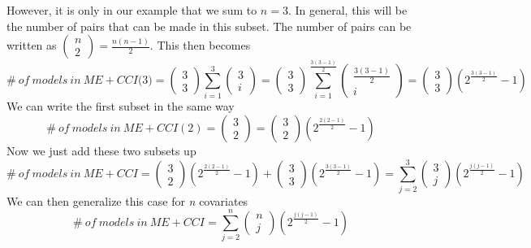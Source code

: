 However, it is only in our example that we sum to $n=3$. In general, this will be the number of pairs that can be made in this subset. The number of pairs can be written as $\left( \begin{array}{c}
n \\ 
2 \end{array}
\right)=\frac{n\left(n-1\right)}{2}$. This then becomes
\[\#\ of\ models\ in\ ME + CCI\textit{(3)}=\left( \begin{array}{c}
3 \\ 
3 \end{array}
\right)\sum^3_{i=1}{\left( \begin{array}{c}
3 \\ 
i \end{array}
\right)}=\left( \begin{array}{c}
3 \\ 
3 \end{array}
\right)\sum^{\frac{3\left(3-1\right)}{2}}_{i=1}{\left( \begin{array}{c}
\frac{3\left(3-1\right)}{2} \\ 
i \end{array}
\right)}=\left( \begin{array}{c}
3 \\ 
3 \end{array}
\right)\left(2^{\frac{3\left(3-1\right)}{2}}-1\right)\] 
We can write the first subset in the same way
\[\#\ of\ models\ in\ ME + CCI(2)=\left( \begin{array}{c}
3 \\ 
2 \end{array}
\right)=\left( \begin{array}{c}
3 \\ 
2 \end{array}
\right)\left(2^{\frac{2\left(2-1\right)}{2}}-1\right)\] 
Now we just add these two subsets up
\[\#\ of\ models\ in\ ME + CCI=\left( \begin{array}{c}
3 \\ 
2 \end{array}
\right)\left(2^{\frac{2\left(2-1\right)}{2}}-1\right)+\left( \begin{array}{c}
3 \\ 
3 \end{array}
\right)\left(2^{\frac{3\left(3-1\right)}{2}}-1\right)=\sum^3_{j=2}{\left( \begin{array}{c}
3 \\ 
j \end{array}
\right)\left(2^{\frac{j\left(j-1\right)}{2}}-1\right)}\] 
We can then generalize this case for \textit{n} covariates
\[\#\ of\ models\ in\ ME+CCI=\sum^n_{j=2}{\left( \begin{array}{c}
n \\ 
j \end{array}
\right)\left(2^{\frac{j\left(j-1\right)}{2}}-1\right)}\] 

